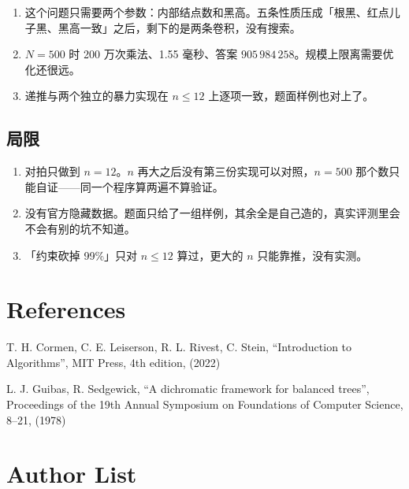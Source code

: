 \documentclass[12pt,a4paper,fontset=windows]{ctexart}
\begin{document}
\begin{enumerate}[leftmargin=1.6em,itemsep=0.25em]
\item 这个问题只需要两个参数：内部结点数和黑高。五条性质压成「根黑、红点儿子黑、黑高一致」之后，剩下的是两条卷积，没有搜索。
\item $N=500$ 时 200 万次乘法、1.55 毫秒、答案 $905\,984\,258$。规模上限离需要优化还很远。
\item 递推与两个独立的暴力实现在 $n\le 12$ 上逐项一致，题面样例也对上了。
\end{enumerate}

\subsection{局限}

\begin{enumerate}[leftmargin=1.6em,itemsep=0.25em]
\item 对拍只做到 $n=12$。$n$ 再大之后没有第三份实现可以对照，$n=500$ 那个数只能自证——同一个程序算两遍不算验证。
\item 没有官方隐藏数据。题面只给了一组样例，其余全是自己造的，真实评测里会不会有别的坑不知道。
\item 「约束砍掉 99\%」只对 $n\le 12$ 算过，更大的 $n$ 只能靠推，没有实测。
\end{enumerate}

\section*{References}

\begin{enumerate}[leftmargin=2.2em,itemsep=0.3em,label={[\arabic*]}]
\item T. H. Cormen, C. E. Leiserson, R. L. Rivest, C. Stein, ``Introduction to Algorithms'', MIT Press, 4th edition, (2022)
\item L. J. Guibas, R. Sedgewick, ``A dichromatic framework for balanced trees'', Proceedings of the 19th Annual Symposium on Foundations of Computer Science, 8--21, (1978)
\end{enumerate}

\clearpage
\section*{Author List}
\end{document}
